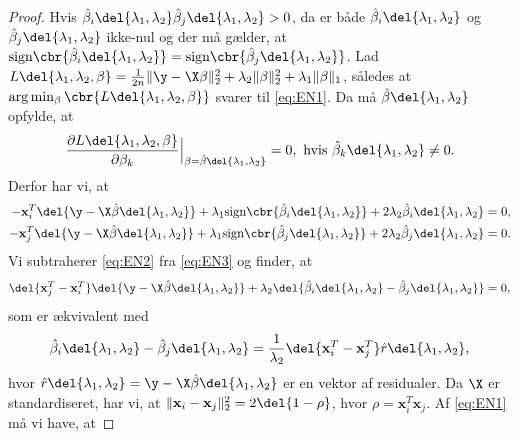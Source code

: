 \begin{proof}
Hvis \(\hat{\beta}_i \del{\lambda_1, \lambda_2} \hat{\beta}_j \del{\lambda_1, \lambda_2} > 0\), da er både \(\hat{\beta}_i \del{\lambda_1, \lambda_2}\) og \(\hat{\beta}_j \del{\lambda_1, \lambda_2}\) ikke-nul og der må gælder, at \(\text{sign} \cbr{\hat{\beta}_i \del{\lambda_1, \lambda_2}} = \text{sign} \cbr{\hat{\beta}_j \del{\lambda_1, \lambda_2}}\).
Lad \(L \del{\lambda_1,\lambda_2, \beta} = \frac{1}{2n} \Vert \y - \X \beta \Vert_2^2 + \lambda_2 \Vert \beta \Vert_2^2 + \lambda_1 \Vert \beta \Vert_1\), således at  \(\arg \min_{\beta} \cbr{L \del{\lambda_1,\lambda_2, \beta}}\) svarer til \eqref{eq:EN1}.
Da må \(\hat{\beta} \del{\lambda_1, \lambda_2}\) opfylde, at
\begin{align*}
\frac{\partial L \del{\lambda_1,\lambda_2, \beta} }{\partial \beta_k} \Bigr|_{\beta = \hat{\beta} \del{\lambda_1, \lambda_2}}=0, \text{ hvis } \hat{\beta}_k \del{\lambda_1, \lambda_2} \neq 0.
\end{align*}
Derfor har vi, at
\begin{align}
-\mathbf{x}_i^T \del{\y - \X \hat{\beta} \del{\lambda_1, \lambda_2}} +  \lambda_1 \text{sign} \cbr{\hat{\beta}_i \del{\lambda_1, \lambda_2}} + 2 \lambda_2 \hat{\beta}_i \del{\lambda_1, \lambda_2} &= 0, \label{eq:EN2}\\
-\mathbf{x}_j^T \del{\y - \X \hat{\beta} \del{\lambda_1, \lambda_2}} + \lambda_1 \text{sign} \cbr{\hat{\beta}_j \del{\lambda_1, \lambda_2}}+ 2 \lambda_2 \hat{\beta}_j \del{\lambda_1, \lambda_2} &= 0. \label{eq:EN3}
\end{align}
Vi subtraherer \eqref{eq:EN2} fra \eqref{eq:EN3} og finder, at
\begin{align*}
\del{\mathbf{x}_j^T-\mathbf{x}_i^T} \del{\y - \X \hat{\beta} \del{\lambda_1, \lambda_2}} + \lambda_2 \del{\hat{\beta}_i \del{\lambda_1, \lambda_2} - \hat{\beta}_j \del{\lambda_1, \lambda_2}} =0,
\end{align*}
som er ækvivalent med
\begin{align}
\hat{\beta}_i \del{\lambda_1, \lambda_2} - \hat{\beta}_j \del{\lambda_1, \lambda_2} = \frac{1}{\lambda_2} \del{\mathbf{x}_i^T-\mathbf{x}_j^T} \hat{r}\del{\lambda_1, \lambda_2}, \label{eq:EN4}
\end{align}
hvor \(\hat{r}\del{\lambda_1, \lambda_2} = \y - \X  \hat{\beta} \del{\lambda_1, \lambda_2}\) er en vektor af residualer.
Da \(\X\) er standardiseret, har vi, at \(\Vert \mathbf{x}_i - \mathbf{x}_j \Vert_2^2=2 \del{1-\rho}\), hvor \(\rho = \mathbf{x}_i^T \mathbf{x}_j\).
Af \eqref{eq:EN1} må vi have, at

\end{proof}
